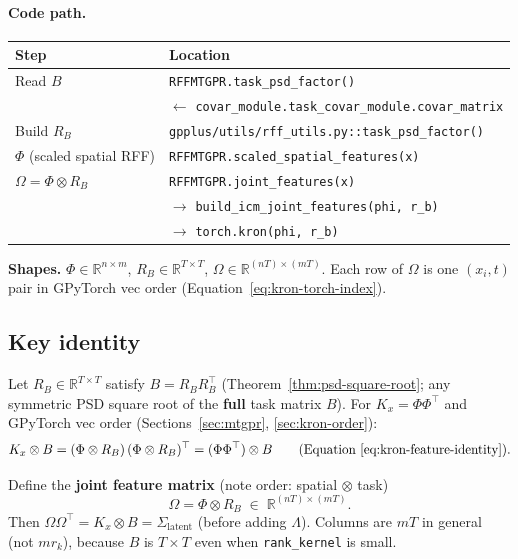 \documentclass[11pt]{article}
\theoremstyle{plain}
\newcommand{\Sig}{\Sigma}
\newcommand{\Ph}{\Phi}
\newcommand{\Om}{\Omega}
\newcommand{\RB}{R_B}
\begin{document}
\paragraph{Code path.}
\begin{center}
\small
\begin{tabular}{@{}ll@{}}
\toprule
\textbf{Step} & \textbf{Location} \\
\midrule
Read $B$ & \texttt{RFFMTGPR.task\_psd\_factor()} \\
         & $\leftarrow$ \texttt{covar\_module.task\_covar\_module.covar\_matrix} \\
Build $\RB$ & \texttt{gpplus/utils/rff\_utils.py::task\_psd\_factor()} \\
$\Ph$ (scaled spatial RFF) & \texttt{RFFMTGPR.scaled\_spatial\_features(x)} \\
$\Om = \Ph \otimes \RB$ & \texttt{RFFMTGPR.joint\_features(x)} \\
         & $\rightarrow$ \texttt{build\_icm\_joint\_features(phi, r\_b)} \\
         & $\rightarrow$ \texttt{torch.kron(phi, r\_b)} \\
\bottomrule
\end{tabular}
\end{center}

\begin{samebox}
\textbf{Shapes.} $\Ph \in \mathbb{R}^{n \times m}$, $\RB \in \mathbb{R}^{T \times T}$,
$\Om \in \mathbb{R}^{(nT) \times (mT)}$.
Each row of $\Om$ is one $(x_i, t)$ pair in GPyTorch vec order (Equation~\eqref{eq:kron-torch-index}).
\end{samebox}

\subsection{Key identity}

Let $\RB \in \mathbb{R}^{T \times T}$ satisfy $B = \RB\RB^\top$ (Theorem~\ref{thm:psd-square-root};
any symmetric PSD square root of the \textbf{full} task matrix $B$).
For $K_x = \Ph\Ph^\top$ and GPyTorch vec order (Sections~\ref{sec:mtgpr}, \ref{sec:kron-order}):
\begin{equation}
  \label{eq:kronecker-gram}
  K_x \otimes B
  = (\Ph \otimes \RB)\,(\Ph \otimes \RB)^\top
  = (\Ph\Ph^\top) \otimes B
  \qquad\text{(Equation~\eqref{eq:kron-feature-identity}).}
\end{equation}

Define the \textbf{joint feature matrix} (note order: spatial $\otimes$ task)
\begin{equation}
  \label{eq:omega}
  \boxed{
    \Om = \Ph \otimes \RB
    \;\in\; \mathbb{R}^{(nT) \times (mT)}.
  }
\end{equation}
Then $\Om\Om^\top = K_x \otimes B = \Sig_{\mathrm{latent}}$ (before adding $\Lambda$).
Columns are $mT$ in general (not $m r_k$), because $B$ is $T \times T$ even when
\texttt{rank\_kernel} is small.
\end{document}
